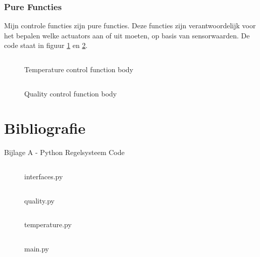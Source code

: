 \documentclass[a4paper]{report}
\begin{document}
\subsection{Pure Functies}
Mijn controle functies zijn pure functies. Deze functies zijn verantwoordelijk voor het bepalen welke actuators aan of uit moeten, op basis van sensorwaarden.
De code staat in figuur \ref{fig:temp_control} en \ref{fig:quality_control}.
\begin{figure}[H]
  \inputminted[firstline=17, lastline=35,bgcolor=bg,linenos, breaklines]{Python}{../Code/temperature.py}
  \caption{Temperature control function body}
  \label{fig:temp_control}
\end{figure}

\begin{figure}[H]
  \inputminted[firstline=14, lastline=21,bgcolor=bg,linenos, breaklines]{Python}{../Code/quality.py}
  \caption{Quality control function body}
  \label{fig:quality_control}
\end{figure}

\chapter{Bibliografie}
\nocite{*} %
\begingroup
\renewcommand{\chapter}[2]{} %
\renewcommand{\addcontentsline}[3]{} %


\endgroup

\chapter{Bijlagen}
\section{Bijlage A - Python Regelsysteem Code}
\label{sec:bijlageA}
\begin{figure}[H]
  \inputminted[firstline=1,bgcolor=bg,linenos, breaklines]{Python}{../Code/interfaces.py}
  \caption{interfaces.py}
\end{figure}

\begin{figure}[H]
  \inputminted[firstline=1,bgcolor=bg,linenos, breaklines]{Python}{../Code/quality.py}
  \caption{quality.py}
\end{figure}
\begin{figure}[H]
  \inputminted[firstline=1,bgcolor=bg,linenos, breaklines]{Python}{../Code/temperature.py}
  \caption{temperature.py}
\end{figure}

\begin{figure}[H]
    \inputminted[firstline=2,bgcolor=bg,linenos, breaklines]{Python}{../Code/main.py}
    \caption{main.py}
\end{figure}
\end{document}
